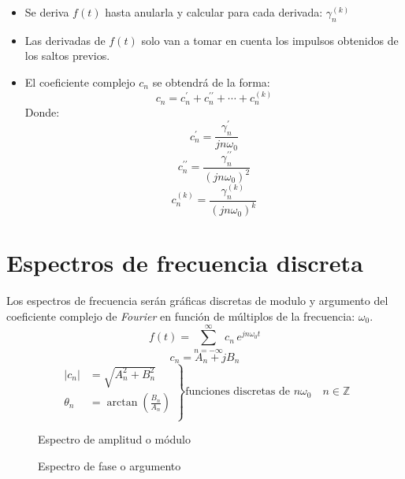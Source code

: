 \begin{itemize}
    \item Se deriva $f(t)$ hasta anularla y calcular para cada derivada:
    $\gamma^{(k)}_n$
    \item Las derivadas de $f(t)$ solo van a tomar en cuenta los impulsos
    obtenidos de los saltos previos.
    \item El coeficiente complejo $c_n$ se obtendrá de la forma:
    \begin{equation}
        c_n=c^\prime_n+c^{\prime\prime}_n+\cdots+c^{(k)}_n
    \end{equation}
    Donde:
    \begin{equation}
        c^\prime_n=\frac{\gamma^\prime_n}{jn\omega_0}
    \end{equation}
    \begin{equation}
        c^{\prime\prime}_n=\frac{\gamma^{\prime\prime}_n}{{(jn\omega_0)}^2}
    \end{equation}
    \begin{equation}
        c^{(k)}_n=\frac{\gamma^{(k)}_n}{{(jn\omega_0)}^k}
    \end{equation}
\end{itemize}

\section{Espectros de frecuencia discreta}
Los espectros de frecuencia serán gráficas discretas de modulo y argumento del
coeficiente complejo de \emph{Fourier} en función de múltiplos de la frecuencia:
$\omega_0$.
\begin{equation*}
    f(t)=\sum_{n=-\infty}^\infty c_n\,e^{jn\omega_0 t}
\end{equation*}
\begin{equation*}
    c_n=A_n+jB_n
\end{equation*}
\begin{equation*}
\left.\begin{aligned}
    |c_n|&=\sqrt{A_n^2+B_n^2}\\
    \theta_n&=\arctan\left(\frac{B_n}{A_n}\right)\\
\end{aligned}\right\}
\text{funciones discretas de }n\omega_0\quad n\in\mathbb{Z}
\end{equation*}
\begin{figure}[H]
    \centering
    \begin{minipage}{.4\textwidth}
        \centering
        
        \captionsetup{labelformat=empty}
        \caption{Espectro de amplitud o módulo}
    \end{minipage}
    \begin{minipage}{.4\textwidth}
        \centering
        
        \captionsetup{labelformat=empty}
        \caption{Espectro de fase o argumento}
    \end{minipage}
\end{figure}

